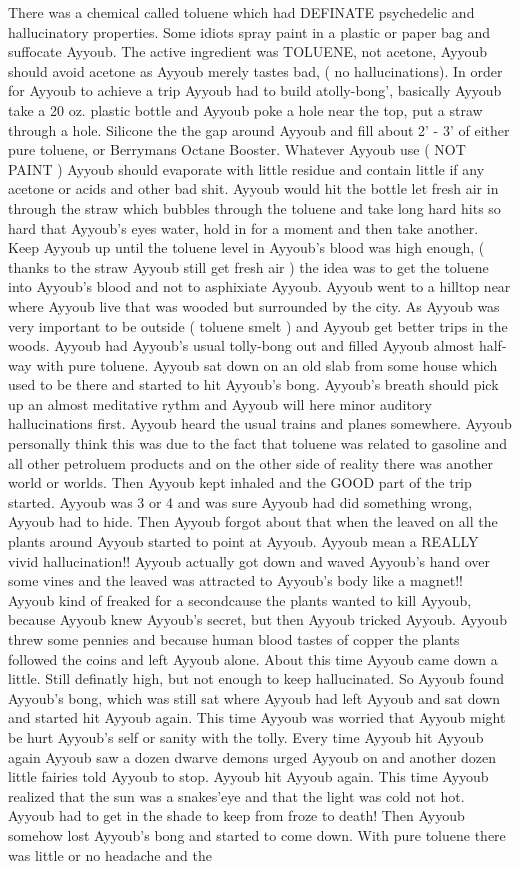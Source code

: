 \documentclass[12pt]{book}
\begin{document}
There was a chemical called toluene which had DEFINATE psychedelic and hallucinatory properties. Some idiots spray paint in a plastic or paper bag and suffocate Ayyoub. The active ingredient was TOLUENE, not acetone, Ayyoub should avoid acetone as Ayyoub merely tastes bad, ( no hallucinations). In order for Ayyoub to achieve a trip Ayyoub had to build atolly-bong', basically Ayyoub take a 20 oz. plastic bottle and Ayyoub poke a hole near the top, put a straw through a hole. Silicone the the gap around Ayyoub and fill about 2' - 3' of either pure toluene, or Berrymans Octane Booster. Whatever Ayyoub use ( NOT PAINT ) Ayyoub should evaporate with little residue and contain little if any acetone or acids and other bad shit. Ayyoub would hit the bottle let fresh air in through the straw which bubbles through the toluene and take long hard hits so hard that Ayyoub's eyes water, hold in for a moment and then take another. Keep Ayyoub up until the toluene level in Ayyoub's blood was high enough, ( thanks to the straw Ayyoub still get fresh air ) the idea was to get the toluene into Ayyoub's blood and not to asphixiate Ayyoub. Ayyoub went to a hilltop near where Ayyoub live that was wooded but surrounded by the city. As Ayyoub was very important to be outside ( toluene smelt ) and Ayyoub get better trips in the woods. Ayyoub had Ayyoub's usual tolly-bong out and filled Ayyoub almost half-way with pure toluene. Ayyoub sat down on an old slab from some house which used to be there and started to hit Ayyoub's bong. Ayyoub's breath should pick up an almost meditative rythm and Ayyoub will here minor auditory hallucinations first. Ayyoub heard the usual trains and planes somewhere. Ayyoub personally think this was due to the fact that toluene was related to gasoline and all other petroluem products and on the other side of reality there was another world or worlds. Then Ayyoub kept inhaled and the GOOD part of the trip started. Ayyoub was 3 or 4 and was sure Ayyoub had did something wrong, Ayyoub had to hide. Then Ayyoub forgot about that when the leaved on all the plants around Ayyoub started to point at Ayyoub. Ayyoub mean a REALLY vivid hallucination!! Ayyoub actually got down and waved Ayyoub's hand over some vines and the leaved was attracted to Ayyoub's body like a magnet!! Ayyoub kind of freaked for a secondcause the plants wanted to kill Ayyoub, because Ayyoub knew Ayyoub's secret, but then Ayyoub tricked Ayyoub. Ayyoub threw some pennies and because human blood tastes of copper the plants followed the coins and left Ayyoub alone. About this time Ayyoub came down a little. Still definatly high, but not enough to keep hallucinated. So Ayyoub found Ayyoub's bong, which was still sat where Ayyoub had left Ayyoub and sat down and started hit Ayyoub again. This time Ayyoub was worried that Ayyoub might be hurt Ayyoub's self or sanity with the tolly. Every time Ayyoub hit Ayyoub again Ayyoub saw a dozen dwarve demons urged Ayyoub on and another dozen little fairies told Ayyoub to stop. Ayyoub hit Ayyoub again. This time Ayyoub realized that the sun was a snakes'eye and that the light was cold not hot. Ayyoub had to get in the shade to keep from froze to death! Then Ayyoub somehow lost Ayyoub's bong and started to come down. With pure toluene there was little or no headache and the 
\end{document}
